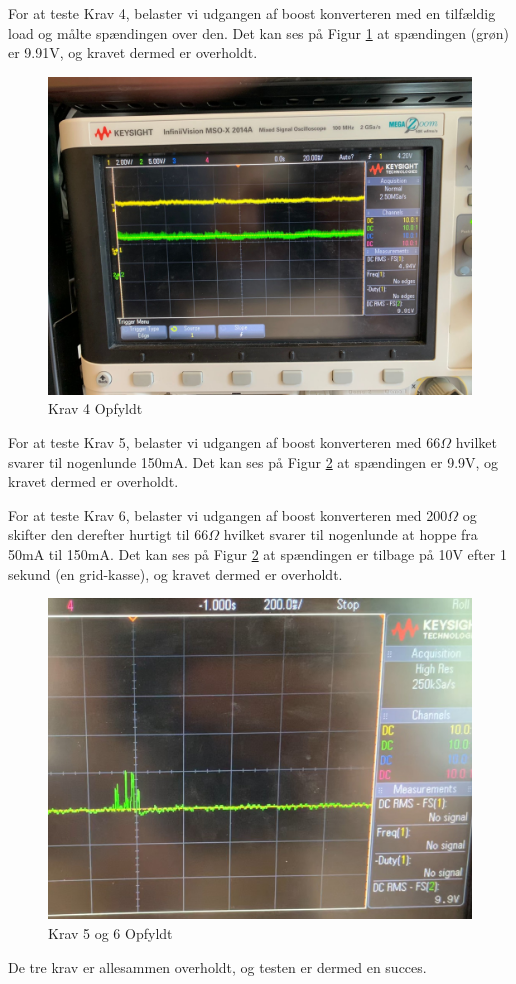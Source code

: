 \documentclass[../main.tex]{subfiles}
\begin{document}
For at teste Krav 4, belaster vi udgangen af boost konverteren med en tilfældig load og målte spændingen over den. Det kan ses på Figur \ref{fig: Krav 4 Opfyldt} at spændingen (grøn) er 9.91V, og kravet dermed er overholdt.
\begin{figure}[H]
      \includegraphics[width=\textwidth]{Dokumentation/Pictures/Krav4.jpg}
     \caption{Krav 4 Opfyldt}
     \label{fig: Krav 4 Opfyldt}
     \end{figure}

For at teste Krav 5, belaster vi udgangen af boost konverteren med 66$\Omega$ hvilket svarer til nogenlunde 150mA. Det kan ses på Figur \ref{fig: Krav 5 og 6 Opfyldt} at spændingen er 9.9V, og kravet dermed er overholdt.

For at teste Krav 6, belaster vi udgangen af boost konverteren med 200$\Omega$ og skifter den derefter hurtigt til 66$\Omega$ hvilket svarer til nogenlunde at hoppe fra 50mA til 150mA. Det kan ses på Figur \ref{fig: Krav 5 og 6 Opfyldt} at spændingen er tilbage på 10V efter 1 sekund (en grid-kasse), og kravet dermed er overholdt.

\begin{figure}[H]
      \includegraphics[width=\textwidth]{Dokumentation/Pictures/Krav5og6.jpg}
     \caption{Krav 5 og 6 Opfyldt}
     \label{fig: Krav 5 og 6 Opfyldt}
     \end{figure}

De tre krav er allesammen overholdt, og testen er dermed en succes. 
\end{document}

